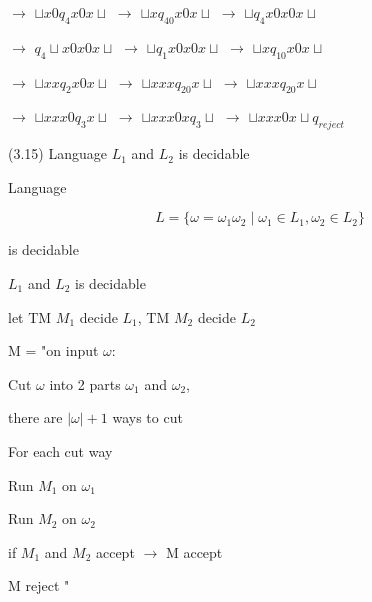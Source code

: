\documentclass{article}
\begin{document}
$\to$ ${\sqcup}x0q_4x0x{\sqcup}$ $\to$ ${\sqcup}xq_40x0x{\sqcup}$ $\to$ ${\sqcup}q_4x0x0x{\sqcup}$
 
$\to$ $q_4{\sqcup}x0x0x{\sqcup}$ $\to$ ${\sqcup}q_1x0x0x{\sqcup}$ $\to$ ${\sqcup}xq_10x0x{\sqcup}$ 

$\to$ ${\sqcup}xxq_2x0x{\sqcup}$ $\to$ ${\sqcup}xxxq_20x{\sqcup}$ $\to$ ${\sqcup}xxxq_20x{\sqcup}$ 

$\to$ ${\sqcup}xxx0q_3x{\sqcup}$ $\to$ ${\sqcup}xxx0xq_3{\sqcup}$ $\to$ ${\sqcup}xxx0x{\sqcup}q_{reject}$

\vspace{5mm}

\hspace{0.5cm}(3.15) Language $L_1$ and $L_2$ is decidable

\hspace{0.5cm}Language 

$$L = \{ {\omega} = {\omega}_1{\omega}_2 \mid {\omega}_1 \in L_1, {\omega}_2 \in L_2 \}$$

\hspace{0.5cm}is decidable

\vspace{5mm}

\hspace{0.5cm} $L_1$ and $L_2$ is decidable

\hspace{0.5cm} let TM $M_1$ decide $L_1$, TM $M_2$ decide $L_2$

\hspace{0.5cm} M = "on input $\omega$:

\hspace{2cm} Cut $\omega$ into 2 parts ${\omega}_1$ and ${\omega}_2$, 

\hspace{2cm} there are $|\omega| + 1$ ways to cut

\hspace{2cm} For each cut way

\hspace{2.5cm}Run $M_1$ on ${\omega}_1$

\hspace{2.5cm}Run $M_2$ on ${\omega}_2$

\hspace{2.5cm}if $M_1$ and $M_2$ accept $\to$ M accept

\hspace{2cm} M reject "

\vspace{5mm}
\end{document}
